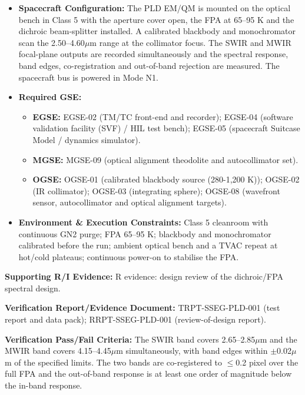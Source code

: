 \begin{itemize}
\item \textbf{Spacecraft Configuration:} The PLD EM/QM is mounted on the optical bench in Class 5 with the aperture cover open, the FPA at 65--95 K and the dichroic beam-splitter installed. A calibrated blackbody and monochromator scan the 2.50--4.60$\mu$m range at the collimator focus. The SWIR and MWIR focal-plane outputs are recorded simultaneously and the spectral response, band edges, co-registration and out-of-band rejection are measured. The spacecraft bus is powered in Mode N1.
\item \textbf{Required GSE:}
\begin{itemize}
\item \textbf{EGSE:} EGSE-02 (TM/TC front-end and recorder); EGSE-04 (software validation facility (SVF) / HIL test bench); EGSE-05 (spacecraft Suitcase Model / dynamics simulator).
\item \textbf{MGSE:} MGSE-09 (optical alignment theodolite and autocollimator set).
\item \textbf{OGSE:} OGSE-01 (calibrated blackbody source (280-1,200 K)); OGSE-02 (IR collimator); OGSE-03 (integrating sphere); OGSE-08 (wavefront sensor, autocollimator and optical alignment targets).
\end{itemize}
\item \textbf{Environment \& Execution Constraints:} Class 5 cleanroom with continuous GN2 purge; FPA 65--95 K; blackbody and monochromator calibrated before the run; ambient optical bench and a TVAC repeat at hot/cold plateaus; continuous power-on to stabilise the FPA.
\end{itemize}
\par\textbf{Supporting R/I Evidence:} R evidence: design review of the dichroic/FPA spectral design.
\par\textbf{Verification Report/Evidence Document:} TRPT-SSEG-PLD-001 (test report and data pack); RRPT-SSEG-PLD-001 (review-of-design report).
\par\textbf{Verification Pass/Fail Criteria:} The SWIR band covers 2.65--2.85$\mu$m and the MWIR band covers 4.15--4.45$\mu$m simultaneously, with band edges within $\pm$0.02$\mu$m of the specified limits. The two bands are co-registered to $\le$0.2 pixel over the full FPA and the out-of-band response is at least one order of magnitude below the in-band response.
\par\medskip
